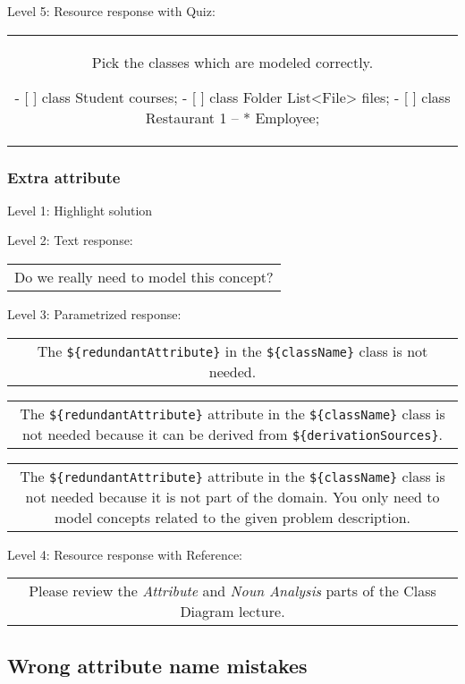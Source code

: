 \noindent Level 5: Resource response with Quiz:

\begin{tabular}{|c}
Pick the classes which are modeled correctly.

- [ ] class Student { courses; }
- [ ] class Folder { List<File> files; }
- [ ] class Restaurant { 1 -- * Employee; }
\end{tabular} \medskip


\subsubsection{Extra attribute}

\noindent Level 1: Highlight solution \medskip

\noindent Level 2: Text response: \medskip

\begin{tabular}{|c}
Do we really need to model this concept?
\end{tabular} \medskip

\noindent Level 3: Parametrized response: \medskip

\begin{tabular}{|c}
The \verb|${redundantAttribute}| in the \verb|${className}| class is not needed.
\end{tabular} \medskip

\begin{tabular}{|c}
The \verb|${redundantAttribute}| attribute in the \verb|${className}| class is not needed because it can be derived from \verb|${derivationSources}|.
\end{tabular} \medskip

\begin{tabular}{|c}
The \verb|${redundantAttribute}| attribute in the \verb|${className}| class is not needed because it is not part of the domain. You only need to model concepts related to the given problem description.
\end{tabular} \medskip

\noindent Level 4: Resource response with Reference:

\begin{tabular}{|c}
Please review the \textit{Attribute} and \textit{Noun Analysis} parts of the Class Diagram lecture.
\end{tabular} \medskip


\subsection{Wrong attribute name mistakes}

